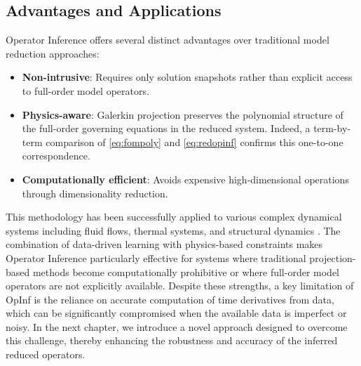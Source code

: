 \subsection*{Advantages and Applications}
Operator Inference offers several distinct advantages over traditional model reduction approaches:
\begin{itemize}
    \item \textbf{Non-intrusive}: Requires only solution snapshots rather than explicit access to full-order model operators.
    \item \textbf{Physics-aware}: Galerkin projection preserves the polynomial structure of the full-order governing equations in the reduced system. Indeed, a term-by-term comparison of \eqref{eq:fompoly} and \eqref{eq:redopinf} confirms this one-to-one correspondence.
    \item \textbf{Computationally efficient}: Avoids expensive high-dimensional operations through dimensionality reduction.  
\end{itemize}

This methodology has been successfully applied to various complex dynamical systems including fluid flows, thermal systems, and structural dynamics \cite{ghattas2021learning,rowley2017model}. The combination of data-driven learning with physics-based constraints makes Operator Inference particularly effective for systems where traditional projection-based methods become computationally prohibitive or where full-order model operators are not explicitly available. Despite these strengths, a key limitation of OpInf is the reliance on accurate computation of time derivatives from data, which can be significantly compromised when the available data is imperfect or noisy. In the next chapter, we introduce a novel approach designed to overcome this challenge, thereby enhancing the robustness and accuracy of the inferred reduced operators.


